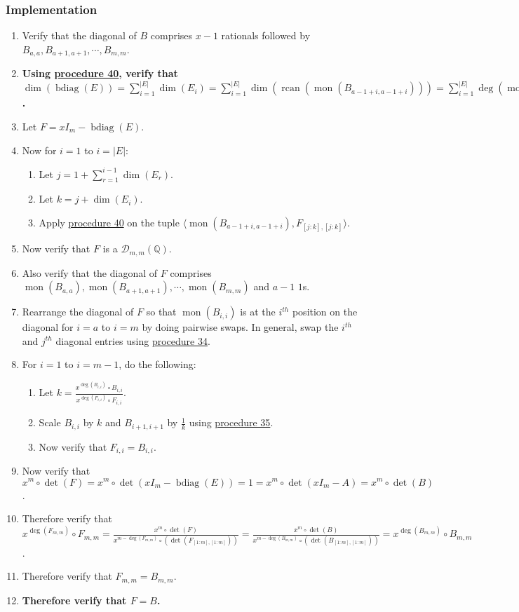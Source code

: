 \documentclass[twocolumn]{article}
\DeclareMathOperator{\bdiag}{bdiag}
\DeclareMathOperator{\rcan}{rcan}
\DeclareMathOperator{\mon}{mon}
\begin{document}
			\subsubsection{Implementation}
				\begin{enumerate}
					\item Verify that the diagonal of $B$ comprises $x-1$ rationals followed by $B_{a,a},B_{a+1,a+1},\cdots,B_{m,m}$.
					\item \textbf{Using \hyperref[sec:procedure 40]{procedure 40}, verify that $\dim(\bdiag(E))=\sum_{i=1}^{\lvert E\rvert}\dim(E_i)=\sum_{i=1}^{\lvert E\rvert}\dim(\rcan(\mon(B_{a-1+i,a-1+i})))=\sum_{i=1}^{\lvert E\rvert}\deg(\mon(B_{a-1+i,a-1+i}))=\sum_{i=1}^{m+1-a}\deg(B_{a-1+i,a-1+i})=\sum_{i=a}^m\deg(B_{i,i})=m$.}
					\item Let $F=xI_m-\bdiag(E)$.
					\item Now for $i=1$ to $i=\lvert E\rvert$:
					\begin{enumerate}
						\item Let $j=1+\sum_{r=1}^{i-1}\dim(E_r)$.
						\item Let $k=j+\dim(E_i)$.
						\item Apply \hyperref[sec:procedure 40]{procedure 40} on the tuple $\langle\mon(B_{a-1+i,a-1+i}),F_{[j:k],[j:k]}\rangle$.
					\end{enumerate}
					\item Now verify that $F$ is a $\mathcal{D}_{m,m}(\mathbb{Q})$.
					\item Also verify that the diagonal of $F$ comprises $\mon(B_{a,a}),\mon(B_{a+1,a+1}),\cdots,\mon(B_{m,m})$ and $a-1$ $1$s.
					\item Rearrange the diagonal of $F$ so that $\mon(B_{i,i})$ is at the $i^{th}$ position on the diagonal for $i=a$ to $i=m$ by doing pairwise swaps. In general, swap the $i^{th}$ and $j^{th}$ diagonal entries using \hyperref[sec:procedure 34]{procedure 34}.
					\item For $i=1$ to $i=m-1$, do the following:
					\begin{enumerate}
						\item Let $k=\frac{x^{\deg(B_{i,i})}\circ B_{i,i}}{x^{\deg(F_{i,i})}\circ F_{i,i}}$.
						\item Scale $B_{i,i}$ by $k$ and $B_{i+1,i+1}$ by $\frac{1}{k}$ using \hyperref[sec:procedure 35]{procedure 35}.
						\item Now verify that $F_{i,i}=B_{i,i}$.
					\end{enumerate}
					\item Now verify that $x^m\circ\det(F)=x^m\circ\det(xI_m-\bdiag(E))=1=x^m\circ\det(xI_m-A)=x^m\circ\det(B)$.
					\item Therefore verify that $x^{\deg(F_{m,m})}\circ F_{m,m}=\frac{x^m\circ\det(F)}{x^{m-\deg(F_{m,m})}\circ(\det(F_{[1:m],[1:m]}))}=\frac{x^m\circ\det(B)}{x^{m-\deg(B_{m,m})}\circ(\det(B_{[1:m],[1:m]}))}=x^{\deg(B_{m,m})}\circ B_{m,m}$.
					\item Therefore verify that $F_{m,m}=B_{m,m}$.
					\item \textbf{Therefore verify that $F=B$.}
				\end{enumerate}
\end{document}
